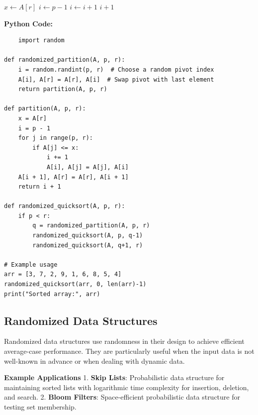 \documentclass[12pt]{book} %
\begin{document}
\begin{algorithm}[H]
\caption{Partition}
\begin{algorithmic}[1]
    \State $x \gets A[r]$
    \State $i \gets p - 1$
            \State $i \gets i + 1$
            \State {}
        \EndIf
    \EndFor
    \State {}
    \State \Return $i + 1$
\EndFunction
\end{algorithmic}
\end{algorithm}
\FloatBarrier
\textbf{Python Code:}
\FloatBarrier
\begin{lstlisting}
    import random

def randomized_partition(A, p, r):
    i = random.randint(p, r)  # Choose a random pivot index
    A[i], A[r] = A[r], A[i]  # Swap pivot with last element
    return partition(A, p, r)

def partition(A, p, r):
    x = A[r]
    i = p - 1
    for j in range(p, r):
        if A[j] <= x:
            i += 1
            A[i], A[j] = A[j], A[i]
    A[i + 1], A[r] = A[r], A[i + 1]
    return i + 1

def randomized_quicksort(A, p, r):
    if p < r:
        q = randomized_partition(A, p, r)
        randomized_quicksort(A, p, q-1)
        randomized_quicksort(A, q+1, r)

# Example usage
arr = [3, 7, 2, 9, 1, 6, 8, 5, 4]
randomized_quicksort(arr, 0, len(arr)-1)
print("Sorted array:", arr)
\end{lstlisting}

\subsection{Randomized Data Structures}
Randomized data structures use randomness in their design to achieve efficient average-case performance. They are particularly useful when the input data is not well-known in advance or when dealing with dynamic data.

\textbf{Example Applications}
1. \textbf{Skip Lists}: Probabilistic data structure for maintaining sorted lists with logarithmic time complexity for insertion, deletion, and search.
2. \textbf{Bloom Filters}: Space-efficient probabilistic data structure for testing set membership.
\end{document}
